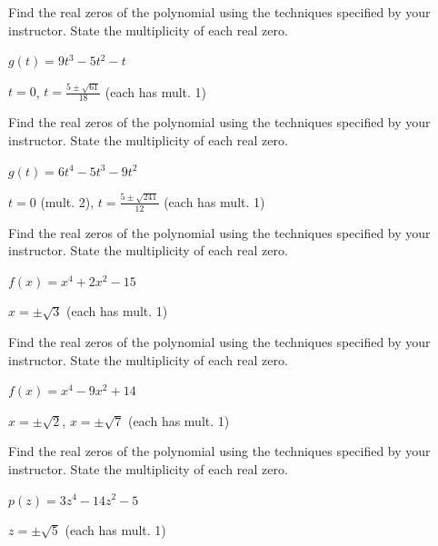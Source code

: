 \documentclass{ximera}
\begin{document}
\begin{problem}
Find the real zeros of the polynomial using the techniques specified by your instructor.  State the multiplicity of each real zero.

$g(t) = 9t^{3} - 5t^{2} - t$

\begin{solution}
$t = 0$, $t = \frac{5 \pm \sqrt{61}}{18}$ (each has mult. 1)
\end{solution}
\end{problem}

\begin{problem}
Find the real zeros of the polynomial using the techniques specified by your instructor.  State the multiplicity of each real zero.

$g(t) = 6t^{4} - 5t^{3} - 9t^{2}$

\begin{solution}
$t = 0$ (mult. 2), $t = \frac{5 \pm \sqrt{241}}{12}$ (each has mult. 1)
\end{solution}

\end{problem}

\begin{problem}
Find the real zeros of the polynomial using the techniques specified by your instructor.  State the multiplicity of each real zero.

$f(x) = x^4+2x^2 - 15$

\begin{solution}
$x = \pm \sqrt{3}$ (each has mult. 1)
\end{solution}

\end{problem}

\begin{problem}
Find the real zeros of the polynomial using the techniques specified by your instructor.  State the multiplicity of each real zero.

$f(x) = x^4-9x^2+14$

\begin{solution}
$x = \pm \sqrt{2}$, $x = \pm \sqrt{7}$ (each has mult. 1) 
\end{solution}
\end{problem}

\begin{problem}
Find the real zeros of the polynomial using the techniques specified by your instructor.  State the multiplicity of each real zero.

$p(z) = 3z^4-14z^2-5$

\begin{solution}
$z = \pm \sqrt{5}$ (each has mult. 1) 
\end{solution}

\end{problem}
\end{document}

